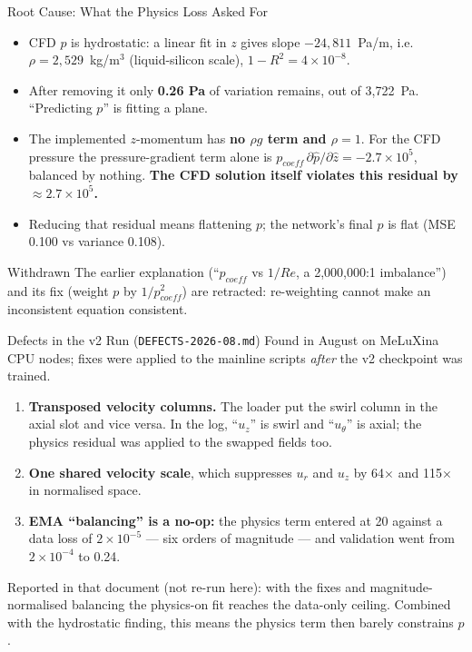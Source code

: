 \documentclass[aspectratio=169]{beamer}
\begin{document}
\begin{frame}{Root Cause: What the Physics Loss Asked For}
\begin{itemize}
  \item CFD $p$ is hydrostatic: a linear fit in $z$ gives slope $-24{,}811$~Pa/m, i.e.\ $\rho=2{,}529$~kg/m$^3$ (liquid-silicon scale), $1-R^2=4\times10^{-8}$.
  \item After removing it only \textbf{0.26 Pa} of variation remains, out of 3,722~Pa. ``Predicting $p$'' is fitting a plane.
  \item The implemented $z$-momentum has \textbf{no $\rho g$ term and $\rho=1$}. For the CFD pressure the pressure-gradient term alone is $p_{coeff}\,\partial\hat p/\partial\hat z=-2.7\times10^{5}$, balanced by nothing. \textbf{The CFD solution itself violates this residual by $\approx2.7\times10^{5}$.}
  \item Reducing that residual means flattening $p$; the network's final $p$ is flat (MSE 0.100 vs variance 0.108).
\end{itemize}

\vspace{0.2cm}
\begin{alertblock}{Withdrawn}
The earlier explanation (``$p_{coeff}$ vs $1/Re$, a 2,000,000:1 imbalance'') and its fix (weight $p$ by $1/p_{coeff}^2$) are retracted: re-weighting cannot make an inconsistent equation consistent.
\end{alertblock}
\end{frame}

\begin{frame}{Defects in the v2 Run (\texttt{DEFECTS-2026-08.md})}
Found in August on MeLuXina CPU nodes; fixes were applied to the mainline scripts \emph{after} the v2 checkpoint was trained.

\begin{enumerate}
  \item \textbf{Transposed velocity columns.} The loader put the swirl column in the axial slot and vice versa. In the log, ``$u_z$'' is swirl and ``$u_\theta$'' is axial; the physics residual was applied to the swapped fields too.
  \item \textbf{One shared velocity scale}, which suppresses $u_r$ and $u_z$ by 64$\times$ and 115$\times$ in normalised space.
  \item \textbf{EMA ``balancing'' is a no-op:} the physics term entered at 20 against a data loss of $2\times10^{-5}$ --- six orders of magnitude --- and validation went from $2\times10^{-4}$ to 0.24.
\end{enumerate}

\vspace{0.2cm}
Reported in that document (not re-run here): with the fixes and magnitude-normalised balancing the physics-on fit reaches the data-only ceiling. Combined with the hydrostatic finding, this means the physics term then barely constrains $p$.
\end{frame}
\end{document}
